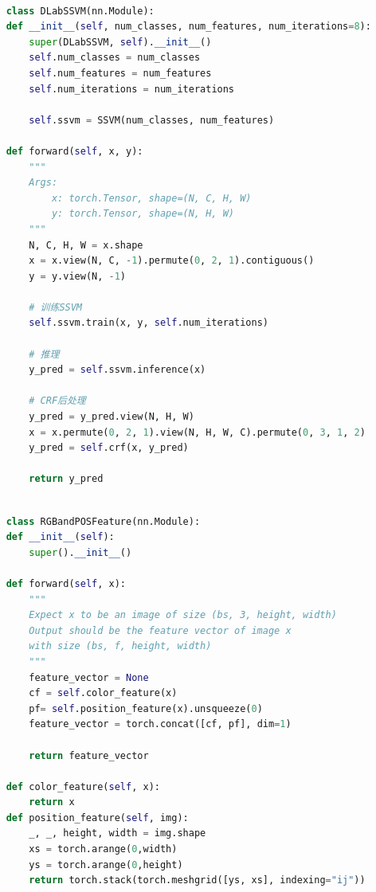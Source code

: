 \documentclass[a4paper,12pt]{ctexart}
\begin{document}
\begin{lstlisting}[language=Python]

    class DLabSSVM(nn.Module):
    def __init__(self, num_classes, num_features, num_iterations=8):
        super(DLabSSVM, self).__init__()
        self.num_classes = num_classes
        self.num_features = num_features
        self.num_iterations = num_iterations

        self.ssvm = SSVM(num_classes, num_features)

    def forward(self, x, y):
        """
        Args:
            x: torch.Tensor, shape=(N, C, H, W)
            y: torch.Tensor, shape=(N, H, W)
        """
        N, C, H, W = x.shape
        x = x.view(N, C, -1).permute(0, 2, 1).contiguous()
        y = y.view(N, -1)

        # 训练SSVM
        self.ssvm.train(x, y, self.num_iterations)

        # 推理
        y_pred = self.ssvm.inference(x)

        # CRF后处理
        y_pred = y_pred.view(N, H, W)
        x = x.permute(0, 2, 1).view(N, H, W, C).permute(0, 3, 1, 2)
        y_pred = self.crf(x, y_pred)

        return y_pred

\end{lstlisting}

\begin{lstlisting}[language=Python]

    class RGBandPOSFeature(nn.Module):
    def __init__(self):
        super().__init__()
    
    def forward(self, x):
        """
        Expect x to be an image of size (bs, 3, height, width)
        Output should be the feature vector of image x
        with size (bs, f, height, width)
        """
        feature_vector = None
        cf = self.color_feature(x)
        pf= self.position_feature(x).unsqueeze(0)
        feature_vector = torch.concat([cf, pf], dim=1)

        return feature_vector

    def color_feature(self, x):
        return x
    def position_feature(self, img):
        _, _, height, width = img.shape
        xs = torch.arange(0,width)
        ys = torch.arange(0,height)
        return torch.stack(torch.meshgrid([ys, xs], indexing="ij"))

\end{lstlisting}



\end{document}

